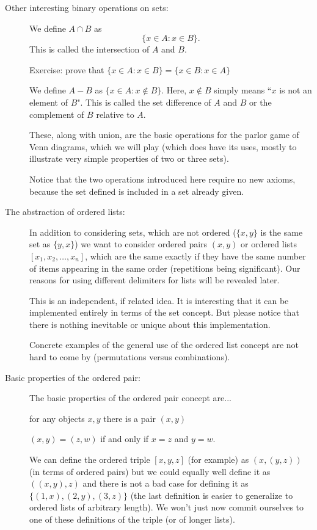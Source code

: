 \documentclass[12pt]{article}
\begin{document}
\begin{description}
\item[Other interesting binary operations on sets:]

We define $A \cap B$ as $$\{x \in A:x \in B\}.$$  This is called the intersection of $A$ and $B$.

Exercise:  prove that $\{x \in A:x \in B\} = \{x \in B:x \in A\}$

We define $A - B$ as $\{x \in A:x \not\in B\}$.  Here, $x \not\in B$ simply means ``$x$ is not an element of $B$".
This is called the set difference of $A$ and $B$ or the complement of $B$ relative to $A$.

These, along with union, are the basic operations for the parlor game of Venn diagrams, which we will play (which does have its uses, mostly to illustrate very simple properties of two or three sets).

Notice that the two operations introduced here require no new axioms, because the set defined is included in a set already given.

\item[The abstraction of ordered lists:]

In addition to considering sets, which are not ordered ($\{x,y\}$ is the same set as $\{y,x\}$) we want to consider
ordered pairs $(x,y)$ or ordered lists $[x_1,x_2,\ldots,x_n]$, which are the same exactly if they have the same number of items appearing in the same order (repetitions being significant).  Our reasons for using different delimiters for lists will be revealed later.

This is an independent, if related idea.  It is interesting that it can be implemented entirely in terms of the set concept.  But please notice that there is nothing inevitable or unique about this implementation.

Concrete examples of the general use of the ordered list concept are not hard to come by (permutations versus combinations).

\item[Basic properties of the ordered pair:]

The basic properties of the ordered pair concept are...

for any objects $x,y$ there is a pair $(x,y)$

$(x,y) = (z,w)$ if and only if $x=z$ and $y=w$.

We can define the ordered triple $[x,y,z]$ (for example) as $(x,(y,z))$ (in terms of ordered pairs) but we could equally well define it as $((x,y),z)$ and there is not a bad case for defining it as $\{(1,x),(2,y),(3,z)\}$ (the last definition is easier to generalize to ordered lists of arbitrary length).  We won't just now commit ourselves to one of these definitions of the triple
(or of longer lists).


\end{description}
\end{document}
